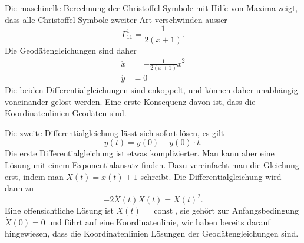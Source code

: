 \begin{loesung}
\begin{teilaufgaben}
\item
Die maschinelle Berechnung der Christoffel-Symbole mit Hilfe von
Maxima zeigt, dass alle Christoffel-Symbole zweiter Art verschwinden
ausser
\[
\Gamma^{1}_{11}=\frac1{2(x+1)}.
\]
Die Geodätengleichungen sind daher
\begin{align*}
\ddot x&=-\frac1{2(x+1)}\dot x^2
\\
\ddot y&=0
\end{align*}
Die beiden Differentialgleichungen sind enkoppelt, und können daher
unabhängig voneinander gelöst werden.
Eine erste Konsequenz davon ist, dass die Koordinatenlinien
Geodäten sind.

Die zweite Differentialgleichung lässt sich sofort lösen, es gilt
\[
y(t) = y(0) + \dot y(0)\cdot t.
\]
Die erste Differentialgleichung ist etwas komplizierter.
Man kann aber eine Lösung mit einem Exponentialansatz finden.
Dazu vereinfacht man die Gleichung erst, indem man $X(t)=x(t)+1$ schreibt.
Die Differentialgleichung wird dann zu
\begin{equation}
-2\ddot X(t) X(t) = \dot X(t)^2.
\label{uebung:0301:Dgl}
\end{equation}
Eine offensichtliche Lösung ist $X(t)=\operatorname{const}$, sie gehört
zur Anfangsbedingung $\dot X(0)=0$ und führt auf eine Koordinatenlinie,
wir haben bereits darauf hingewiesen, dass die Koordinatenlinien
Lösungen der Geodätengleichungen sind.


\end{teilaufgaben}
\end{loesung}
